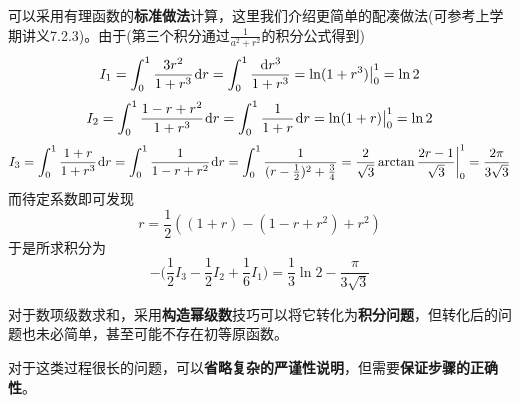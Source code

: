 \documentclass[a4paper,UTF8,fontset=windows,AutoFakeBold]{ctexart}
\newcommand*{\dr}{\hspace{0.07em}\mathrm{d}}
\newcommand*{\note}{\noindent *}
\theoremstyle{ex}
\begin{document}
\begin{framed}
{\begin{itemize}
        可以采用有理函数的\textbf{标准做法}计算，这里我们介绍更简单的配凑做法(可参考上学期讲义7.2.3)。由于(第三个积分通过$\frac{1}{a^2+r^2}$的积分公式得到)
        $$I_1=\int_0^1\frac{3r^2}{1+r^3}\dr r=\int_0^1\frac{\dr r^3}{1+r^3}=\ln(1+r^3)\big|^1_0=\ln2$$
        $$I_2=\int_0^1\frac{1-r+r^2}{1+r^3}\dr r=\int_0^1\frac{1}{1+r}\dr r=\ln(1+r)\big|^1_0=\ln2$$
        $$I_3=\int_0^1\frac{1+r}{1+r^3}\dr r=\int_0^1\frac{1}{1-r+r^2}\dr r=\int_0^1\frac{1}{(r-\frac{1}{2})^2+\frac{3}{4}}=\frac{2}{\sqrt3}\arctan\frac{2r-1}{\sqrt3}\bigg|^1_0=\frac{2\pi}{3\sqrt3}$$
        而待定系数即可发现
        $$r=\frac{1}{2}((1+r)-(1-r+r^2)+r^2)$$
        于是所求积分为
        $$-\bigg(\frac{1}{2}I_3-\frac{1}{2}I_2+\frac{1}{6}I_1\bigg)=\frac{1}{3}\ln2-\frac{\pi}{3\sqrt3}$$
    \end{itemize}
}
\end{framed}

\note 对于数项级数求和，采用\textbf{构造幂级数}技巧可以将它转化为\textbf{积分问题}，但转化后的问题也未必简单，甚至可能不存在初等原函数。

\note 对于这类过程很长的问题，可以\textbf{省略复杂的严谨性说明}，但需要\textbf{保证步骤的正确性}。
\end{document}
